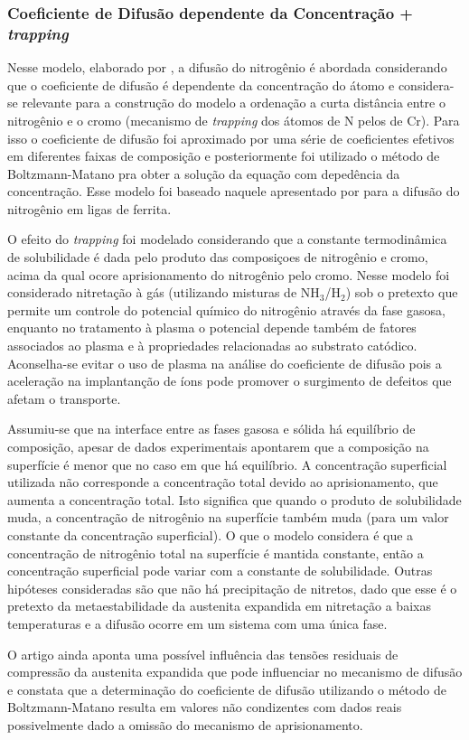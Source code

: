 \documentclass[]{politex}
\begin{document}
\subsubsection{Coeficiente de Difusão dependente da Concentração + \textit{trapping}}
\label{sec:comb-depc-td}
	Nesse modelo, elaborado por \cite{christiansen2008nitrogen}, a difusão do nitrogênio é abordada considerando que o coeficiente de difusão é dependente da concentração do átomo  e considera-se relevante para a construção do modelo a ordenação a curta distância entre o nitrogênio e o cromo (mecanismo de \textit{trapping} dos átomos de N pelos de Cr). Para isso o coeficiente de difusão foi aproximado por uma série de coeficientes efetivos em diferentes faixas de composição e posteriormente foi utilizado o método de Boltzmann-Matano pra obter a solução da equação com depedência da concentração. Esse modelo foi baseado naquele apresentado por \cite{sun1997numerical} para a difusão do nitrogênio em ligas de ferrita.\par
	O efeito do \textit{trapping} foi modelado considerando que a constante termodinâmica de solubilidade é dada pelo produto das composiçoes de nitrogênio e cromo, acima da qual ocore aprisionamento do nitrogênio pelo cromo.
	Nesse modelo foi considerado nitretação à gás (utilizando misturas de NH$_3$/H$_2$) sob o pretexto que permite um controle do potencial químico do nitrogênio através da fase gasosa, enquanto no tratamento à plasma o potencial depende também de fatores associados ao plasma e à propriedades relacionadas ao substrato catódico. Aconselha-se evitar o uso de plasma na análise do coeficiente de difusão pois a aceleração na implantanção de íons pode promover o surgimento de defeitos que afetam o transporte.\par
	Assumiu-se que na interface entre as fases gasosa e sólida há equilíbrio de composição, apesar de dados experimentais apontarem que a composição na superfície é menor que no caso em que há equilíbrio. A concentração superficial utilizada não corresponde a concentração total devido ao aprisionamento, que aumenta a concentração total. Isto significa que quando o produto de solubilidade muda, a concentração de nitrogênio na superfície também muda (para um valor constante da concentração superficial). O que o modelo considera é que a concentração de nitrogênio total na superfície é mantida constante, então a concentração superficial pode variar com a constante de solubilidade. Outras hipóteses consideradas são que não há precipitação de nitretos, dado que esse é o pretexto da metaestabilidade da austenita expandida em nitretação a baixas temperaturas e a difusão ocorre em um sistema com uma única fase.\par
	O artigo ainda aponta uma possível influência das tensões residuais de compressão da austenita expandida que pode influenciar no mecanismo de difusão e constata que a determinação do coeficiente de difusão utilizando o método de Boltzmann-Matano resulta em valores não condizentes com dados reais possivelmente dado a omissão do mecanismo de aprisionamento.
	
\end{document}
